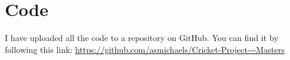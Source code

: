 \chapter{Code}
\label{appendix: code}

I have uploaded all the code to a repository on GitHub. You can find it by following this link: \url{https://github.com/asmichaels/Cricket-Project---Masters}